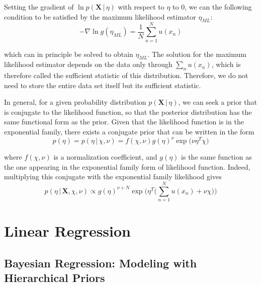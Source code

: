 \documentclass{article}
\begin{document}
    Setting the gradient of $\ln p(\mathbf{X}\,|\, \eta)$ with respect to $\eta$ to $0$, we can the following condition to be satisfied by the maximum likelihood estimator $\eta_{ML}$:
    \begin{equation}
      -\nabla \ln g(\eta_{ML}) = \frac{1}{N} \sum_{n=1}^N u(x_n)
    \end{equation}

    which can in principle be solved to obtain $\eta_{ML}$. The solution for the maximum likelihood estimator depends on the data only through $\sum_n u(x_n)$, which is therefore called the sufficient statistic of this distribution. Therefore, we do not need to store the entire data set itself but its sufficient statistic.

    In general, for a given probability distribution $p(\mathbf{X}\,|\, \eta)$, we can seek a prior that is conjugate to the likelihood function, so that the posterior distribution has the same functional form as the prior. Given that the likelihood function is in the exponential family, there exists a conjugate prior that can be written in the form
    \begin{equation}
      p(\eta) = p(\eta\,|\, \chi, \nu) = f(\chi, \nu) g(\eta)^\nu \exp \big( \nu \eta^T \chi \big)
    \end{equation}

    where $f(\chi, \nu)$ is a normalization coefficient, and $g(\eta)$ is the same function as the one appearing in the exponential family form of likelihood function. Indeed, multiplying this conjugate with the exponential family likelihood gives
    \begin{equation}
      p(\eta\,|\, \mathbf{X}, \chi, \nu) \propto g(\eta)^{\nu + N} \exp \Bigg( \eta^T \bigg( \sum_{n=1}^N u(x_n) + \nu \chi \bigg) \Bigg)
    \end{equation}

\section{Linear Regression}

  \subsection{Bayesian Regression: Modeling with Hierarchical Priors}
\end{document}
